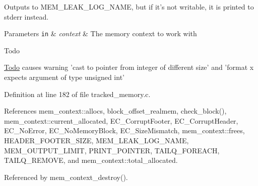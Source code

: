 Outputs to M\-E\-M\-\_\-\-L\-E\-A\-K\-\_\-\-L\-O\-G\-\_\-\-N\-A\-M\-E, but if it's not writable, it is printed to stderr instead.


\begin{DoxyParams}[1]{Parameters}
\mbox{\tt in}  & {\em context} & The memory context to work with \\
\hline
\end{DoxyParams}
\begin{DoxyRefDesc}{Todo}
\item[\hyperlink{todo__todo000001}{Todo}]causes warning 'cast to pointer from integer of different size' and 'format x expects argument of type unsigned int' \end{DoxyRefDesc}


Definition at line 182 of file tracked\-\_\-memory.\-c.



References mem\-\_\-context\-::allocs, block\-\_\-offset\-\_\-realmem, check\-\_\-block(), mem\-\_\-context\-::current\-\_\-allocated, E\-C\-\_\-\-Corrupt\-Footer, E\-C\-\_\-\-Corrupt\-Header, E\-C\-\_\-\-No\-Error, E\-C\-\_\-\-No\-Memory\-Block, E\-C\-\_\-\-Size\-Mismatch, mem\-\_\-context\-::frees, H\-E\-A\-D\-E\-R\-\_\-\-F\-O\-O\-T\-E\-R\-\_\-\-S\-I\-Z\-E, M\-E\-M\-\_\-\-L\-E\-A\-K\-\_\-\-L\-O\-G\-\_\-\-N\-A\-M\-E, M\-E\-M\-\_\-\-O\-U\-T\-P\-U\-T\-\_\-\-L\-I\-M\-I\-T, P\-R\-I\-N\-T\-\_\-\-P\-O\-I\-N\-T\-E\-R, T\-A\-I\-L\-Q\-\_\-\-F\-O\-R\-E\-A\-C\-H, T\-A\-I\-L\-Q\-\_\-\-R\-E\-M\-O\-V\-E, and mem\-\_\-context\-::total\-\_\-allocated.



Referenced by mem\-\_\-context\-\_\-destroy().


